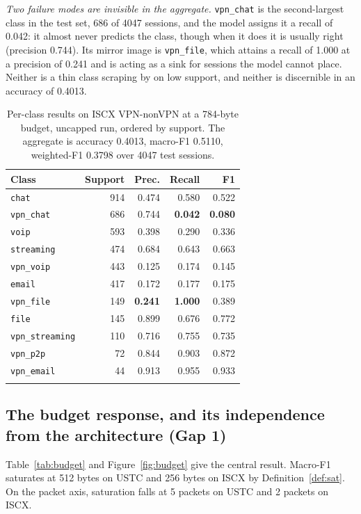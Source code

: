 \documentclass[pdflatex,sn-mathphys-num]{sn-jnl}
\theoremstyle{thmstyleone}%
\theoremstyle{thmstylethree}%
\begin{document}
\emph{Two failure modes are invisible in the aggregate.} \texttt{vpn\_chat}
is the second-largest class in the test set, 686 of 4047 sessions, and the
model assigns it a recall of 0.042: it almost never predicts the class, though
when it does it is usually right (precision 0.744). Its mirror image is
\texttt{vpn\_file}, which attains a recall of 1.000 at a precision of 0.241 and
is acting as a sink for sessions the model cannot place. Neither is a thin
class scraping by on low support, and neither is discernible in an accuracy of
0.4013.

\begin{table}[tbp]
\caption{Per-class results on ISCX VPN-nonVPN at a 784-byte budget, uncapped
run, ordered by support. The aggregate is accuracy 0.4013, macro-F1 0.5110,
weighted-F1 0.3798 over 4047 test sessions.}\label{tab:perclass}
\begin{tabular}{@{}lrrrr@{}}
\toprule
Class & Support & Prec. & Recall & F1 \\
\midrule
\texttt{chat}          & 914 & 0.474 & 0.580 & 0.522 \\
\texttt{vpn\_chat}     & 686 & 0.744 & \textbf{0.042} & \textbf{0.080} \\
\texttt{voip}          & 593 & 0.398 & 0.290 & 0.336 \\
\texttt{streaming}     & 474 & 0.684 & 0.643 & 0.663 \\
\texttt{vpn\_voip}     & 443 & 0.125 & 0.174 & 0.145 \\
\texttt{email}         & 417 & 0.172 & 0.177 & 0.175 \\
\texttt{vpn\_file}     & 149 & \textbf{0.241} & \textbf{1.000} & 0.389 \\
\texttt{file}          & 145 & 0.899 & 0.676 & 0.772 \\
\texttt{vpn\_streaming}& 110 & 0.716 & 0.755 & 0.735 \\
\texttt{vpn\_p2p}      &  72 & 0.844 & 0.903 & 0.872 \\
\texttt{vpn\_email}    &  44 & 0.913 & 0.955 & 0.933 \\
\botrule
\end{tabular}
\end{table}

\subsection{The budget response, and its independence from the architecture (Gap 1)}

Table~\ref{tab:budget} and Figure~\ref{fig:budget} give the central result.
Macro-F1 saturates at 512 bytes on USTC and 256 bytes on ISCX by
Definition~\ref{def:sat}. On the packet axis, saturation falls at 5 packets on USTC
and 2 packets on ISCX.
\end{document}
